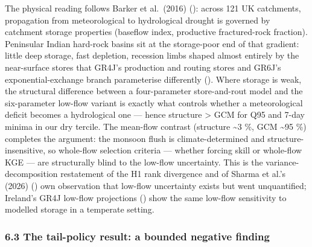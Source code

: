 \documentclass[
  english,
  11pt,
]{article}
\begin{document}
The physical reading follows Barker et al.~(2016)
(): across 121
UK catchments, propagation from meteorological to hydrological drought
is governed by catchment storage properties (baseflow index, productive
fractured-rock fraction). Peninsular Indian hard-rock basins sit at the
storage-poor end of that gradient: little deep storage, fast depletion,
recession limbs shaped almost entirely by the near-surface stores that
GR4J's production and routing stores and GR6J's exponential-exchange
branch parameterise differently
(). Where
storage is weak, the structural difference between a four-parameter
store-and-rout model and the six-parameter low-flow variant is exactly
what controls whether a meteorological deficit becomes a hydrological
one --- hence structure \textgreater{} GCM for Q95 and 7-day minima in
our dry tercile. The mean-flow contrast (structure \textasciitilde3 \%,
GCM \textasciitilde95 \%) completes the argument: the monsoon flush is
climate-determined and structure-insensitive, so whole-flow selection
criteria --- whether forcing skill or whole-flow KGE --- are
structurally blind to the low-flow uncertainty. This is the
variance-decomposition restatement of the H1 rank divergence and of
Sharma et al.'s (2026) ()
own observation that low-flow uncertainty exists but went unquantified;
Ireland's GR4J low-flow projections
() show the same
low-flow sensitivity to modelled storage in a temperate setting.

\subsubsection{6.3 The tail-policy result: a bounded negative
finding}\label{the-tail-policy-result-a-bounded-negative-finding}
\end{document}
